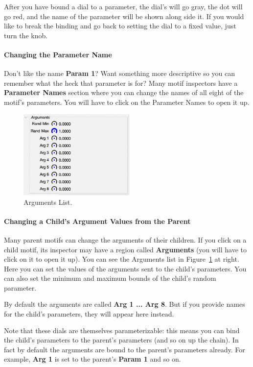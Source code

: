 \documentclass[twoside,10pt]{article}
\begin{document}
After you have bound a dial to a parameter, the dial's will go gray, the dot will go red, and the name of the parameter will be shown along side it. If you would like to break the binding and go back to setting the dial to a fixed value, just turn the knob. 

\paragraph{Changing the Parameter Name} Don't like the name {\bf Param 1}?  Want something more descriptive so you can remember what the heck that parameter is for?  Many motif inspectors have a {\bf Parameter Names} section where you can change the names of all eight of the motif's parameters.  You will have to click on the Parameter Names to open it up.

\begin{figure}
\includegraphics[width=2.25in]{arguments}
\caption{Arguments List.}
\label{arguments}
\end{figure}

\paragraph{Changing a Child's Argument Values from the Parent} Many parent motifs can change the arguments of their children.  If you click on a child motif, its inspector may have a region called {\bf Arguments} (you will have to click on it to open it up).  You can see the Arguments list in Figure~\ref{arguments} at right.  Here you can set the values of the arguments sent to the child's parameters.  You can also set the minimum and maximum bounds of the child's random parameter.   

By default the arguments are called {\bf Arg 1 ... Arg 8}.  But if you provide names for the child's parameters, they will appear here instead.  

Note that these dials are themselves parameterizable: this means you can bind the child's parameters to the parent's parameters (and so on up the chain).  In fact by default the arguments are bound to the parent's parameters already.  For example, {\bf Arg 1} is set to the parent's {\bf Param 1} and so on.
\end{document}
